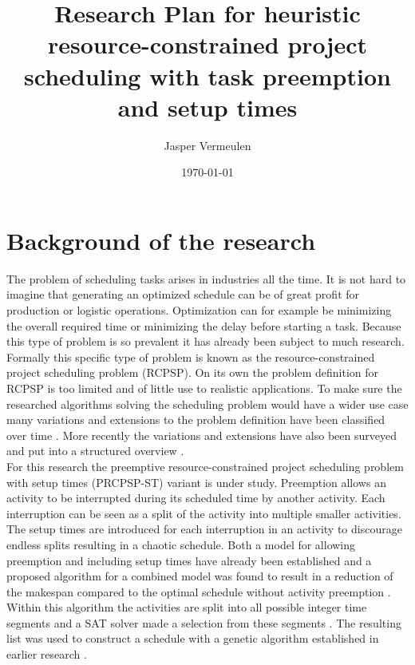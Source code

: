 \documentclass[english]{article}
\title{Research Plan for heuristic resource-constrained project scheduling with task preemption and setup times}
\author{Jasper Vermeulen}
\date{\today}
\begin{document}
\maketitle

\section*{Background of the research}
The problem of scheduling tasks arises in industries all the time. It is not hard to imagine that generating an optimized schedule can be of great profit for production or logistic operations. Optimization can for example be minimizing the overall required time or minimizing the delay before starting a task. Because this type of problem is so prevalent it has already been subject to much research.\\
Formally this specific type of problem is known as the resource-constrained project scheduling problem (RCPSP). On its own the problem definition for RCPSP is too limited and of little use to realistic applications. To make sure the researched algorithms solving the scheduling problem would have a wider use case many variations and extensions to the problem definition have been classified over time \cite{RN9} \cite{RN10}. More recently the variations and extensions have also been surveyed and put into a structured overview \cite{RN6}.\\
For this research the preemptive resource-constrained project scheduling problem with setup times (PRCPSP-ST) variant is under study. Preemption allows an activity to be interrupted during its scheduled time by another activity. Each interruption can be seen as a split of the activity into multiple smaller activities. The setup times are introduced for each interruption in an activity to discourage endless splits resulting in a chaotic schedule. Both a model for allowing preemption \cite{RN21} and including setup times \cite{RN13} have already been established and a proposed algorithm for a combined model was found to result in a reduction of the makespan compared to the optimal schedule without activity preemption \cite{RN1}. Within this algorithm the activities are split into all possible integer time segments and a SAT solver made a selection from these segments \cite{RN3}. The resulting list was used to construct a schedule with a genetic algorithm established in earlier research \cite{RN14}.\\
\end{document}
